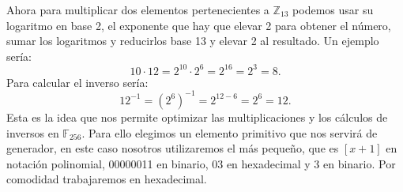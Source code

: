 Ahora para multiplicar dos elementos pertenecientes a $\mathbb{Z}_{13}$ podemos usar su logaritmo en base 2, el exponente que hay que elevar 2 para obtener el número, sumar los logaritmos y reducirlos base 13 y elevar 2 al resultado. Un ejemplo sería:
$$
	10\cdot12=2^{10}\cdot2^{6}=2^{16}=2^3=8.
$$
Para calcular el inverso sería:
$$
	12^{-1}=(2^6)^{-1}=2^{12-6}=2^6=12.
$$
Esta es la idea que nos permite optimizar las multiplicaciones y los cálculos de inversos en $\mathbb{F}_{256}$. Para ello elegimos un elemento primitivo que nos servirá de generador, en este caso nosotros utilizaremos el más pequeño, que es $[x+1]$ en notación polinomial, 00000011 en binario, 03 en hexadecimal y 3 en binario. Por comodidad trabajaremos en hexadecimal. 

\begin{table}[!htb]
\end{table}
